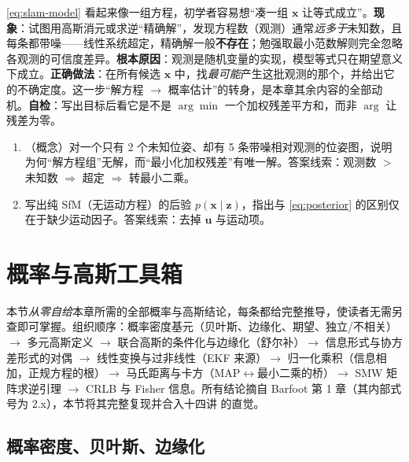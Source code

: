 \begin{pitfall}
\cref{eq:slam-model} 看起来像一组方程，初学者容易想“凑一组 $\mathbf{x}$ 让等式成立”。\textbf{现象}：试图用高斯消元或求逆“精确解”，发现方程数（观测）通常\emph{远多于}未知数，且每条都带噪——线性系统超定，精确解一般\textbf{不存在}；勉强取最小范数解则完全忽略各观测的可信度差异。\textbf{根本原因}：观测是随机变量的实现，模型等式只在期望意义下成立。\textbf{正确做法}：在所有候选 $\mathbf{x}$ 中，找\emph{最可能}产生这批观测的那个，并给出它的不确定度。这一步“解方程 $\to$ 概率估计”的转身，是本章其余内容的全部动机。\textbf{自检}：写出目标后看它是不是 $\arg\min$ 一个加权残差平方和，而非 $\arg$ 让残差为零。
\end{pitfall}

\begin{practice}
\begin{enumerate}
  \item （概念）对一个只有 2 个未知位姿、却有 5 条带噪相对观测的位姿图，说明为何“解方程组”无解，而“最小化加权残差”有唯一解。答案线索：观测数 $>$ 未知数 $\Rightarrow$ 超定 $\Rightarrow$ 转最小二乘。
  \item 写出纯 SfM（无运动方程）的后验 $p(\mathbf{x}\mid\mathbf{z})$，指出与 \cref{eq:posterior} 的区别仅在于缺少运动因子。答案线索：去掉 $\mathbf{u}$ 与运动项。
\end{enumerate}
\end{practice}

\section{概率与高斯工具箱}
\label{sec:est-gauss}

本节\emph{从零自给}本章所需的全部概率与高斯结论，每条都给完整推导，使读者无需另查即可掌握。组织顺序：概率密度基元（贝叶斯、边缘化、期望、独立/不相关）$\to$ 多元高斯定义 $\to$ 联合高斯的条件化与边缘化（舒尔补）$\to$ 信息形式与协方差形式的对偶 $\to$ 线性变换与过非线性（EKF 来源）$\to$ 归一化乘积（信息相加，正规方程的根）$\to$ 马氏距离与卡方（MAP$\leftrightarrow$最小二乘的桥）$\to$ SMW 矩阵求逆引理 $\to$ CRLB 与 Fisher 信息。所有结论摘自 Barfoot\cite{barfoot2024state} 第 1 章（其内部式号为 2.x），本节将其完整复现并合入十四讲\cite{gaoxiang2019slam14} 的直觉。

\subsection{概率密度、贝叶斯、边缘化}
\label{sec:est-prob-basics}

